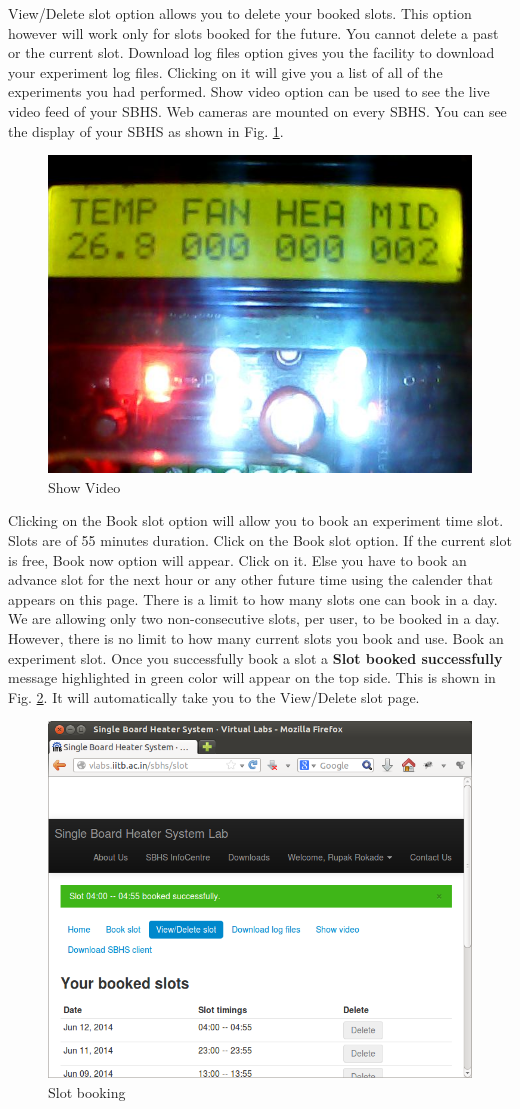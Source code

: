 View/Delete slot option allows you to delete your booked slots. This option however will work only for slots booked for the future. You cannot delete a past or the current slot. Download log files option gives you the facility to download your experiment log files. Clicking on it will give you a list of all of the experiments you had performed. Show video option can be used to see the live video feed of your SBHS. Web cameras are mounted on every SBHS. You can see the display of your SBHS as shown in Fig. \ref{web-cam}.

\begin{figure}
\centering
\includegraphics[width=0.5\linewidth]{vlabs/display.jpg}
\caption{Show Video}
\label{web-cam}
\end{figure}

Clicking on the Book slot option will allow you to book an experiment time slot. Slots are of 55 minutes duration. Click on the Book slot option. If the current slot is free, Book now option will appear. Click on it. Else you have to book an advance slot for the next hour or any other future time using the calender that appears on this page. There is a limit to how many slots one can book in a day. We are allowing only two non-consecutive slots, per user, to be booked in a day. However, there is no limit to how many current slots you book and use. Book an experiment slot. Once you successfully book a slot a {\bf Slot booked successfully} message highlighted in green color will appear on the top side. This is shown in Fig. \ref{book-slot}. It will automatically take you to the View/Delete slot page.

\begin{figure}
\centering
\includegraphics[width=0.7\linewidth]{vlabs/book-slot.png}
\caption{Slot booking}
\label{book-slot}
\end{figure}

